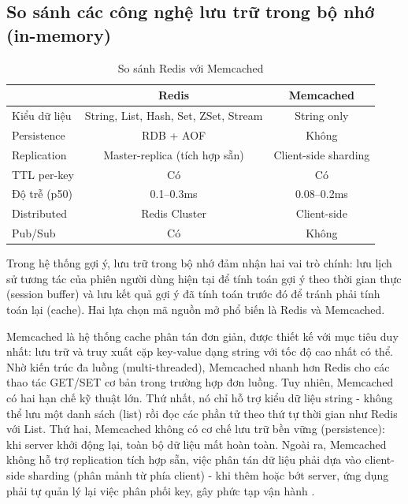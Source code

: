 \documentclass[../BTL.tex]{subfiles}
\begin{document}
\subsection{So sánh các công nghệ lưu trữ trong bộ nhớ (in-memory)}

\begin{table}[H]
\centering
\begin{tabular}{|l|c|c|}
\hline
\textbf{} & \textbf{Redis} & \textbf{Memcached} \\
\hline
Kiểu dữ liệu & String, List, Hash, Set, ZSet, Stream & String only \\
\hline
Persistence & RDB + AOF & Không \\
\hline
Replication & Master-replica (tích hợp sẵn) & Client-side sharding \\
\hline
TTL per-key & Có & Có \\
\hline
Độ trễ (p50) & 0.1–0.3ms & 0.08–0.2ms \\
\hline
Distributed & Redis Cluster & Client-side \\
\hline
Pub/Sub & Có & Không \\
\hline
\end{tabular}
\caption{So sánh Redis với Memcached}
\label{tab:redis_compare}
\end{table}

Trong hệ thống gợi ý, lưu trữ trong bộ nhớ đảm nhận hai vai trò chính: lưu lịch sử tương tác của phiên người dùng hiện tại để tính toán gợi ý theo thời gian thực (session buffer) và lưu kết quả gợi ý đã tính toán trước đó để tránh phải tính toán lại (cache). Hai lựa chọn mã nguồn mở phổ biến là Redis và Memcached.

Memcached là hệ thống cache phân tán đơn giản, được thiết kế với mục tiêu duy nhất: lưu trữ và truy xuất cặp key-value dạng string với tốc độ cao nhất có thể. Nhờ kiến trúc đa luồng (multi-threaded), Memcached nhanh hơn Redis cho các thao tác GET/SET cơ bản trong trường hợp đơn luồng. Tuy nhiên, Memcached có hai hạn chế kỹ thuật lớn. Thứ nhất, nó chỉ hỗ trợ kiểu dữ liệu string - không thể lưu một danh sách (list) rồi đọc các phần tử theo thứ tự thời gian như Redis với List. Thứ hai, Memcached không có cơ chế lưu trữ bền vững (persistence): khi server khởi động lại, toàn bộ dữ liệu mất hoàn toàn. Ngoài ra, Memcached không hỗ trợ replication tích hợp sẵn, việc phân tán dữ liệu phải dựa vào client-side sharding (phân mảnh từ phía client) - khi thêm hoặc bớt server, ứng dụng phải tự quản lý lại việc phân phối key, gây phức tạp vận hành \cite{redis_vs_memcached_techplained}.
\end{document}
